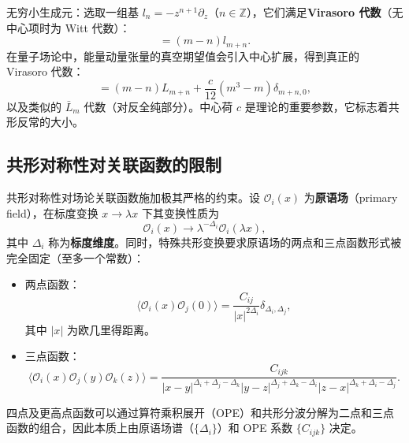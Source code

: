 无穷小生成元：选取一组基 $l_n = -z^{n+1}\partial_z$（$n\in\mathbb{Z}$），它们满足\textbf{Virasoro 代数}（无中心项时为 Witt 代数）：
\begin{equation}
[l_m, l_n] = (m-n) l_{m+n}.
\end{equation}
在量子场论中，能量动量张量的真空期望值会引入中心扩展，得到真正的 Virasoro 代数：
\begin{equation}
[L_m, L_n] = (m-n)L_{m+n} + \frac{c}{12}(m^3-m)\delta_{m+n,0},
\end{equation}
以及类似的 $\bar{L}_m$ 代数（对反全纯部分）。中心荷 $c$ 是理论的重要参数，它标志着共形反常的大小。

\subsection*{共形对称性对关联函数的限制}

共形对称性对场论关联函数施加极其严格的约束。设 $\mathcal{O}_i(x)$ 为\textbf{原语场}（primary field），在标度变换 $x\to \lambda x$ 下其变换性质为
\begin{equation}
\mathcal{O}_i(x) \to \lambda^{-\Delta_i} \mathcal{O}_i(\lambda x),
\end{equation}
其中 $\Delta_i$ 称为\textbf{标度维度}。同时，特殊共形变换要求原语场的两点和三点函数形式被完全固定（至多一个常数）：

\begin{itemize}
    \item 两点函数：
    \begin{equation}
    \langle \mathcal{O}_i(x) \mathcal{O}_j(0) \rangle = \frac{C_{ij}}{|x|^{2\Delta_i}} \delta_{\Delta_i,\Delta_j},
    \label{eq:2pt}
    \end{equation}
    其中 $|x|$ 为欧几里得距离。
    \item 三点函数：
    \begin{equation}
    \langle \mathcal{O}_i(x) \mathcal{O}_j(y) \mathcal{O}_k(z) \rangle = \frac{C_{ijk}}{|x-y|^{\Delta_i+\Delta_j-\Delta_k} |y-z|^{\Delta_j+\Delta_k-\Delta_i} |z-x|^{\Delta_k+\Delta_i-\Delta_j}}.
    \label{eq:3pt}
    \end{equation}
\end{itemize}
四点及更高点函数可以通过算符乘积展开（OPE）和共形分波分解为二点和三点函数的组合，因此本质上由原语场谱（$\{\Delta_i\}$）和 OPE 系数 $\{C_{ijk}\}$ 决定。

